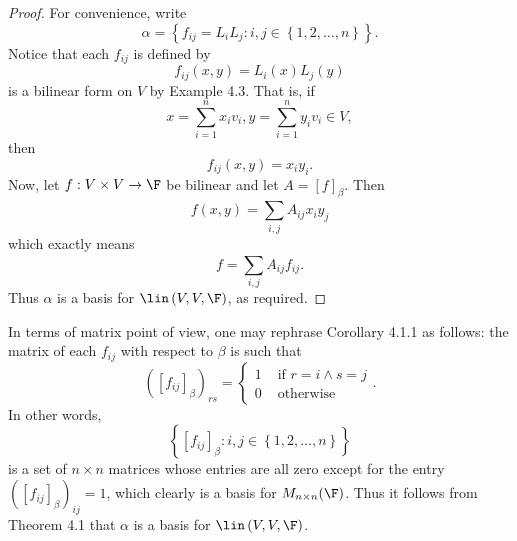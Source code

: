 \documentclass[linearalgebraII]{subfiles}
\begin{document}
    \begin{proof}
        For convenience, write
        \begin{equation*}
            \alpha = \left\lbrace f_{ij}=L_iL_j: i,j\in \left\lbrace 1,2,\ldots,n \right\rbrace  \right\rbrace .
        \end{equation*}
        Notice that each $f_{ij}$ is defined by
        \begin{equation*}
            f_{ij}\left( x,y \right) = L_i(x)L_j(y)
        \end{equation*}
        is a bilinear form on $V$ by Example 4.3. That is, if
        \begin{equation*}
            x = \sum^{n}_{i=1} x_iv_i, y = \sum^{n}_{i=1} y_iv_i\in V,
        \end{equation*}
        then
        \begin{equation*}
            f_{ij} (x,y) = x_iy_i.
        \end{equation*}
        Now, let $f:V\times V\to\F$ be bilinear and let $A = \left[ f \right] _\beta$. Then
        \begin{equation*}
            f\left( x,y \right) = \sum^{}_{i,j} A_{ij}x_iy_j
        \end{equation*}
        which exactly means
        \begin{equation*}
            f = \sum^{}_{i,j} A_{ij}f_{ij}.
        \end{equation*}
        Thus $\alpha$ is a basis for $\lin\left( V,V,\F \right)$, as required.
    \end{proof}

    \begin{remark}
        In terms of matrix point of view, one may rephrase Corollary 4.1.1 as follows: the matrix of each $f_{ij}$ with respect to $\beta$ is such that
        \begin{equation*}
            \left( \left[ f_{ij} \right] _\beta \right) _{rs} =
            \begin{cases}
                1 & \text{ if } r = i \land s = j \\
                0 & \text{ otherwise} 
            \end{cases}.
        \end{equation*}
        In other words,
        \begin{equation*}
            \left\lbrace \left[ f_{ij} \right] _\beta : i,j\in \left\lbrace 1,2,\ldots,n \right\rbrace  \right\rbrace 
        \end{equation*}
        is a set of $n\times n$ matrices whose entries are all zero except for the entry $\left( \left[ f_{ij} \right] _\beta \right) _{ij} = 1$, which clearly is a basis for $M_{n\times n}(\F)$. Thus it follows from Theorem 4.1 that $\alpha$ is a basis for $\lin\left( V,V,\F \right)$.
    \end{remark}
\end{document}
